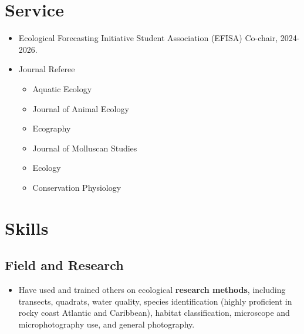 \documentclass[11pt,a4paper,]{awesome-cv}
\providecommand{\tightlist}{%
	\setlength{\itemsep}{0pt}\setlength{\parskip}{0pt}}
\begin{document}
\section{Service}\label{service}

\begin{itemize}
\tightlist
\item
  Ecological Forecasting Initiative Student Association (EFISA)
  Co-chair, 2024-2026.
\item
  Journal Referee

  \begin{itemize}
  \tightlist
  \item
    Aquatic Ecology
  \item
    Journal of Animal Ecology
  \item
    Ecography
  \item
    Journal of Molluscan Studies
  \item
    Ecology
  \item
    Conservation Physiology
  \end{itemize}
\end{itemize}

\section{Skills}\label{skills}

\subsection{Field and Research}\label{field-and-research}

\begin{itemize}
\tightlist
\item
  Have used and trained others on ecological \textbf{research methods},
  including transects, quadrats, water quality, species identification
  (highly proficient in rocky coast Atlantic and Caribbean), habitat
  classification, microscope and microphotography use, and general
  photography.
\end{itemize}
\end{document}
